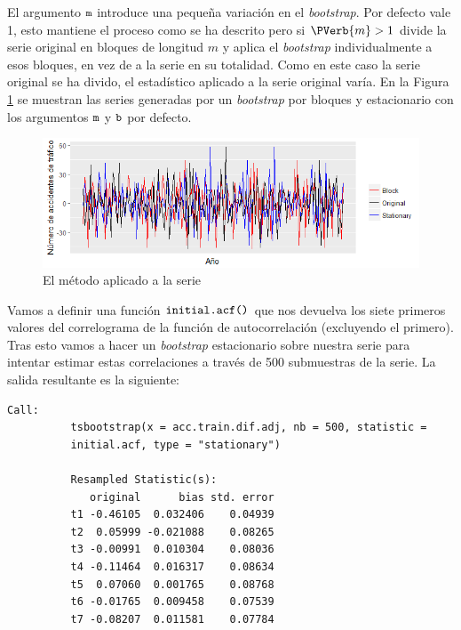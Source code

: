 El argumento $\verb!m!$ introduce una pequeña variación en el \textit{bootstrap}. Por defecto vale 1, esto mantiene el proceso como se ha descrito pero si $\PVerb{m} > 1$ divide la serie original en bloques de longitud $m$ y aplica el \textit{bootstrap} individualmente a esos bloques, en vez de a la serie en su totalidad. Como en este caso la serie original se ha divido, el estadístico aplicado a la serie original varía. En la Figura \ref{bootstrap} se muestran las series generadas por un \textit{bootstrap} por bloques y estacionario con los argumentos $\verb!m!$ y $\verb!b!$ por defecto.

\begin{figure}
    \centering
    \centerline{\includegraphics[scale = 0.7]{Images/Modelizacion/32413242.png}}
    \caption{El método  aplicado a la serie }
    \label{bootstrap}
\end{figure}

Vamos a definir una función $\verb!initial.acf()!$ que nos devuelva los siete primeros valores del correlograma de la función de autocorrelación (excluyendo el primero). Tras esto vamos a hacer un \textit{bootstrap} estacionario sobre nuestra serie para intentar estimar estas correlaciones a través de 500 submuestras de la serie. La salida resultante es la siguiente:
\vspace{1cm}
\begin{Verbatim}[fontsize=\footnotesize]
          Call:
          tsbootstrap(x = acc.train.dif.adj, nb = 500, statistic =
          initial.acf, type = "stationary")

          Resampled Statistic(s):
             original      bias std. error
          t1 -0.46105  0.032406    0.04939
          t2  0.05999 -0.021088    0.08265
          t3 -0.00991  0.010304    0.08036
          t4 -0.11464  0.016317    0.08634
          t5  0.07060  0.001765    0.08768
          t6 -0.01765  0.009458    0.07539
          t7 -0.08207  0.011581    0.07784
\end{Verbatim}

